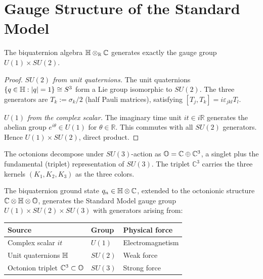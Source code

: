 
\section{Gauge Structure of the Standard Model}
\label{sec:gauge}

\begin{proposition}
\label{prop:biquaternion-u1su2}
The biquaternion algebra $\mathbb{H}\otimes_{\mathbb{R}}\mathbb{C}$ generates
exactly the gauge group $U(1)\times SU(2)$.
\end{proposition}

\begin{proof}
\emph{$SU(2)$ from unit quaternions.}
The unit quaternions $\{q\in\mathbb{H}:|q|=1\}\cong S^3$ form a Lie group
isomorphic to $SU(2)$.
The three generators are $T_k:=\sigma_k/2$ (half Pauli matrices),
satisfying $[T_j,T_k]=i\varepsilon_{jkl}T_l$.

\emph{$U(1)$ from the complex scalar.}
The imaginary time unit $it\in i\mathbb{R}$ generates the abelian group
$e^{i\theta}\in U(1)$ for $\theta\in\mathbb{R}$.
This commutes with all $SU(2)$ generators.
Hence $U(1)\times SU(2)$, direct product.
\end{proof}

\begin{theorem}[$\OO\to SU(3)$]\label{thm:octonion-SU3}
The octonions decompose under $SU(3)$-action as
$\mathbb{O} = \mathbb{C}\oplus\mathbb{C}^3$,
a singlet plus the fundamental (triplet) representation of $SU(3)$.
The triplet $\mathbb{C}^3$ carries the three kernels $(K_1,K_2,K_3)$
as the three colors.
\end{theorem}

\begin{theorem}\label{thm:SM}
The biquaternion ground state $q_n\in\mathbb{H}\otimes\mathbb{C}$, extended to
the octonionic structure $\mathbb{C}\otimes\mathbb{H}\otimes\mathbb{O}$, generates
the Standard Model gauge group $U(1)\times SU(2)\times SU(3)$ with
generators arising from:
\begin{center}
\renewcommand{\arraystretch}{1.3}
\begin{tabular}{lll}
\toprule
Source & Group & Physical force\\
\midrule
Complex scalar $it$ & $U(1)$ & Electromagnetism\\
Unit quaternions $\mathbb{H}$ & $SU(2)$ & Weak force\\
Octonion triplet $\mathbb{C}^3\subset\mathbb{O}$ & $SU(3)$ & Strong force\\
\bottomrule
\end{tabular}
\end{center}
\end{theorem}

